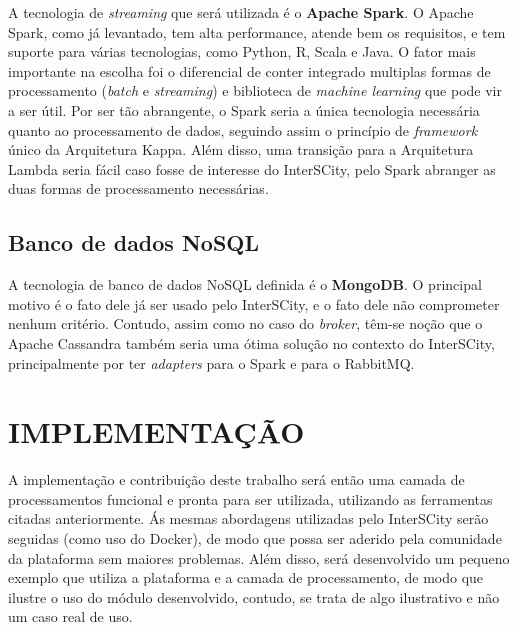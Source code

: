 A tecnologia de \textit{streaming} que será utilizada é o \textbf{Apache Spark}.
O Apache Spark, como já levantado, tem alta performance, atende bem os
requisitos, e tem suporte para várias tecnologias, como Python, R, Scala e
Java. O fator mais importante na escolha foi o diferencial de conter integrado
multiplas formas de processamento (\textit{batch} e \textit{streaming}) e
biblioteca de \textit{machine learning} que pode vir a ser útil.
Por ser tão abrangente, o Spark seria a única tecnologia necessária quanto ao
processamento de dados, seguindo assim o princípio de \textit{framework} único
da Arquitetura Kappa. Além disso, uma transição para a Arquitetura Lambda seria
fácil caso fosse de interesse do InterSCity, pelo Spark abranger as duas formas
de processamento necessárias.

\subsection{Banco de dados NoSQL}

A tecnologia de banco de dados NoSQL definida é o \textbf{MongoDB}. O principal
motivo é o fato dele já ser usado pelo InterSCity, e o fato dele não
comprometer nenhum critério. Contudo, assim como no caso do \textit{broker},
têm-se noção que o Apache Cassandra também seria uma ótima solução no contexto
do InterSCity, principalmente por ter \textit{adapters} para o Spark e para o
RabbitMQ.

\section{IMPLEMENTAÇÃO}

A implementação e contribuição deste trabalho será então uma camada de
processamentos funcional e pronta para ser utilizada, utilizando as
ferramentas citadas anteriormente. Ás mesmas abordagens utilizadas pelo
InterSCity serão seguidas (como uso do Docker), de modo que possa ser
aderido pela comunidade da plataforma sem maiores problemas. Além disso, será
desenvolvido um pequeno exemplo que utiliza a plataforma e a camada de
processamento, de modo que ilustre o uso do módulo desenvolvido, contudo, se
trata de algo ilustrativo e não um caso real de uso.
